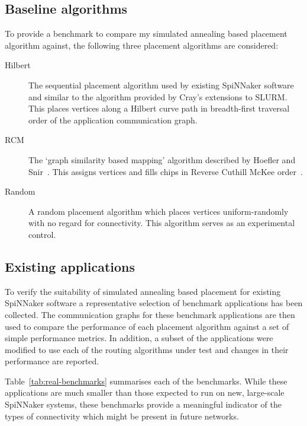 		\subsection{Baseline algorithms}
			
			To provide a benchmark to compare my simulated annealing based placement
			algorithm against, the following three placement algorithms are
			considered:
			
			\begin{description}
				
				\item[Hilbert] The sequential placement algorithm used by existing
				SpiNNaker software and similar to the algorithm provided by Cray's
				extensions to SLURM. This places vertices along a Hilbert curve path in
				breadth-first traversal order of the application communication graph.
				
				\item[RCM] The `graph similarity based mapping' algorithm described by
				Hoefler and Snir~\cite{hoefler11}. This assigns vertices and fills
				chips in Reverse Cuthill McKee order~\cite{cuthill69}.
				
				\item[Random] A random placement algorithm which places vertices
				uniform-randomly with no regard for connectivity. This algorithm serves
				as an experimental control.
				
			\end{description}
			
		\subsection{Existing applications}
			
			\label{sec:existing-applications}
			
			To verify the suitability of simulated annealing based placement for
			existing SpiNNaker software a representative selection of benchmark
			applications has been collected. The communication graphs for these
			benchmark applications are then used to compare the performance of each
			placement algorithm against a set of simple performance metrics. In
			addition, a subset of the applications were modified to use each of the
			routing algorithms under test and changes in their performance are
			reported.
			
			Table~\ref{tab:real-benchmarks} summarises each of the benchmarks. While
			these applications are much smaller than those expected to run on new,
			large-scale SpiNNaker systems, these benchmarks provide a meaningful
			indicator of the types of connectivity which might be present in future
			networks.
			

